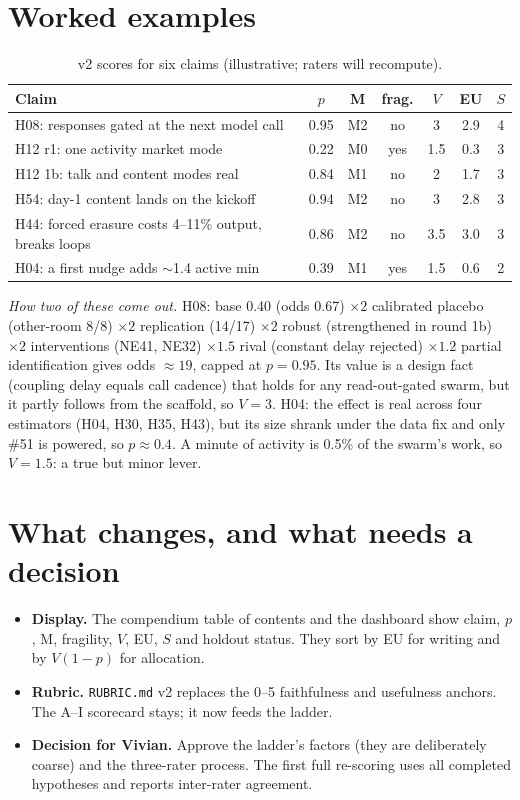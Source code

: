\documentclass[aps,pre,reprint,10pt,nofootinbib]{revtex4-2}
\begin{document}
\section{Worked examples}
\begin{table}[t]
\caption{v2 scores for six claims (illustrative; raters will recompute).}
\label{tab:examples}
\scriptsize
\begin{tabular}{@{}p{3.3cm}cccccc@{}}
\toprule
Claim & $p$ & M & frag. & $V$ & EU & $S$ \\ \midrule
H08: responses gated at the next model call & 0.95 & M2 & no & 3 & 2.9 & 4 \\
H12 r1: one activity market mode & 0.22 & M0 & yes & 1.5 & 0.3 & 3 \\
H12 1b: talk and content modes real & 0.84 & M1 & no & 2 & 1.7 & 3 \\
H54: day-1 content lands on the kickoff & 0.94 & M2 & no & 3 & 2.8 & 3 \\
H44: forced erasure costs 4--11\% output, breaks loops & 0.86 & M2 & no & 3.5 & 3.0 & 3 \\
H04: a first nudge adds $\sim$1.4 active min & 0.39 & M1 & yes & 1.5 & 0.6 & 2 \\
\bottomrule
\end{tabular}
\end{table}
\textit{How two of these come out.} H08: base 0.40 (odds 0.67) $\times2$ calibrated placebo (other-room 8/8) $\times2$ replication (14/17) $\times2$ robust (strengthened in round 1b) $\times2$ interventions (NE41, NE32) $\times1.5$ rival (constant delay rejected) $\times1.2$ partial identification gives odds $\approx 19$, capped at $p=0.95$. Its value is a design fact (coupling delay equals call cadence) that holds for any read-out-gated swarm, but it partly follows from the scaffold, so $V=3$. H04: the effect is real across four estimators (H04, H30, H35, H43), but its size shrank under the data fix and only \#51 is powered, so $p\approx0.4$. A minute of activity is 0.5\% of the swarm's work, so $V=1.5$: a true but minor lever.

\section{What changes, and what needs a decision}
\begin{itemize}
\item \textbf{Display.} The compendium table of contents and the dashboard show claim, $p$, M, fragility, $V$, EU, $S$ and holdout status. They sort by EU for writing and by $V(1-p)$ for allocation.
\item \textbf{Rubric.} \texttt{RUBRIC.md} v2 replaces the 0--5 faithfulness and usefulness anchors. The A--I scorecard stays; it now feeds the ladder.
\item \textbf{Decision for Vivian.} Approve the ladder's factors (they are deliberately coarse) and the three-rater process. The first full re-scoring uses all completed hypotheses and reports inter-rater agreement.
\end{itemize}
\end{document}
